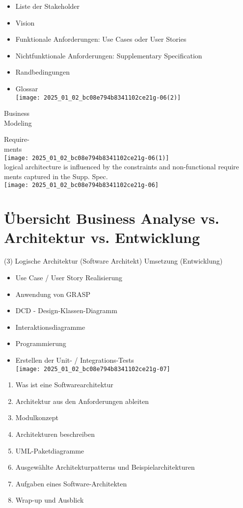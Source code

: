 \documentclass[10pt]{article}
\begin{document}
\begin{itemize}
  \item Liste der Stakeholder
  \item Vision
  \item Funktionale Anforderungen: Use Cases oder User Stories
  \item Nichtfunktionale Anforderungen: Supplementary Specification
  \item Randbedingungen
  \item Glossar\\
\texttt{[image: 2025\_01\_02\_bc08e794b8341102ce21g-06(2)]}
\end{itemize}

Business\\
Modeling

Require-\\
ments\\
\texttt{[image: 2025\_01\_02\_bc08e794b8341102ce21g-06(1)]}\\
logical architecture is influenced by the constraints and non-functional require ments captured in the Supp. Spec.\\
\texttt{[image: 2025\_01\_02\_bc08e794b8341102ce21g-06]}

\section*{Übersicht Business Analyse vs. Architektur vs. Entwicklung}
(3) Logische Architektur (Software Architekt) Umsetzung (Entwicklung)

\begin{itemize}
  \item Use Case / User Story Realisierung
  \item Anwendung von GRASP
  \item DCD - Design-Klassen-Diagramm
  \item Interaktionsdiagramme
  \item Programmierung
  \item Erstellen der Unit- / Integrations-Tests\\
\texttt{[image: 2025\_01\_02\_bc08e794b8341102ce21g-07]}
\end{itemize}

\begin{enumerate}
  \item Was ist eine Softwarearchitektur
  \item Architektur aus den Anforderungen ableiten
  \item Modulkonzept
  \item Architekturen beschreiben
  \item UML-Paketdiagramme
  \item Ausgewählte Architekturpatterns und Beispielarchitekturen
  \item Aufgaben eines Software-Architekten
  \item Wrap-up und Ausblick
\end{enumerate}
\end{document}
